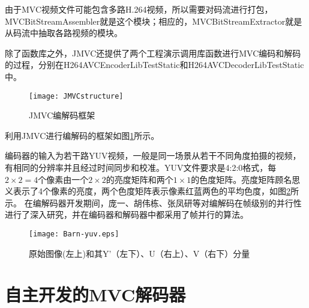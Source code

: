 由于MVC视频文件可能包含多路H.264视频，所以需要对码流进行打包，MVCBitStreamAssembler就是这个模块；相应的，MVCBitStreamExtractor就是从码流中抽取各路视频的模块。

除了函数库之外，JMVC还提供了两个工程演示调用库函数进行MVC编码和解码的过程，分别在H264AVCEncoderLibTestStatic和H264AVCDecoderLibTestStatic中。

\begin{figure}[htbp]
\begin{center}
\texttt{[image: JMVCstructure]}
\caption{JMVC编解码框架}
\label{fig:JMVCstructure}
\end{center}
\end{figure}

利用JMVC进行编解码的框架如图\ref{fig:JMVCstructure}所示。

编码器的输入为若干路YUV视频，一般是同一场景从若干不同角度拍摄的视频，有相同的分辨率并且经过时间同步和校准。YUV文件要求是4:2:0格式，每$2\times2=4$个像素由一个$2\times2$的亮度矩阵和两个$1\times1$的色度矩阵。亮度矩阵顾名思义表示了4个像素的亮度，两个色度矩阵表示像素红蓝两色的平均色度，如图\ref{fig:Barn-yuv}所示。
在编解码器开发期间，庞一、胡伟栋、张凤研等对编解码在帧级别的并行性进行了深入研究\cite{pang2009adaptive,yi2008parallelized}，并在编码器和解码器中都采用了帧并行的算法。

\begin{figure}[htbp]
\begin{center}
\texttt{[image: Barn-yuv.eps]}
\caption{原始图像(左上)和其Y'（左下）、U（右上）、V（右下）分量}
\label{fig:Barn-yuv}
\end{center}
\end{figure}

\section{自主开发的MVC解码器}
\label{sec:mvcdecoder}
